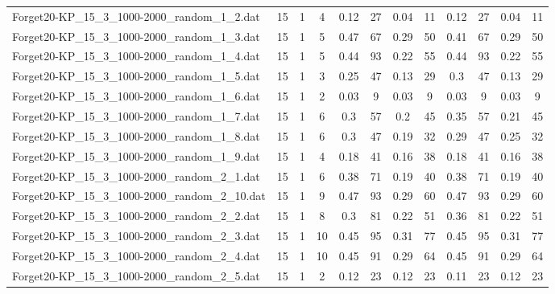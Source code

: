 \begin{sidewaystable}[!ht]
{\begin{tabular}{lccccccccccc}
Forget20-KP\_15\_3\_1000-2000\_random\_1\_2.dat & 15 & 1 & 4 & 0.12 & 27 &  \textcolor{blue2}{0.04} & 11 & 0.12 & 27 &  \textcolor{blue2}{0.04} & 11 \\
Forget20-KP\_15\_3\_1000-2000\_random\_1\_3.dat & 15 & 1 & 5 & 0.47 & 67 &  \textcolor{blue2}{0.29} & 50 & 0.41 & 67 &  \textcolor{blue2}{0.29} & 50 \\
Forget20-KP\_15\_3\_1000-2000\_random\_1\_4.dat & 15 & 1 & 5 & 0.44 & 93 &  \textcolor{blue2}{0.22} & 55 & 0.44 & 93 &  \textcolor{blue2}{0.22} & 55 \\
Forget20-KP\_15\_3\_1000-2000\_random\_1\_5.dat & 15 & 1 & 3 & 0.25 & 47 &  \textcolor{blue2}{0.13} & 29 & 0.3 & 47 &  \textcolor{blue2}{0.13} & 29 \\
Forget20-KP\_15\_3\_1000-2000\_random\_1\_6.dat & 15 & 1 & 2 &  \textcolor{blue2}{0.03} & 9 &  \textcolor{blue2}{0.03} & 9 &  \textcolor{blue2}{0.03} & 9 &  \textcolor{blue2}{0.03} & 9 \\
Forget20-KP\_15\_3\_1000-2000\_random\_1\_7.dat & 15 & 1 & 6 & 0.3 & 57 &  \textcolor{blue2}{0.2} & 45 & 0.35 & 57 & 0.21 & 45 \\
Forget20-KP\_15\_3\_1000-2000\_random\_1\_8.dat & 15 & 1 & 6 & 0.3 & 47 &  \textcolor{blue2}{0.19} & 32 & 0.29 & 47 & 0.25 & 32 \\
Forget20-KP\_15\_3\_1000-2000\_random\_1\_9.dat & 15 & 1 & 4 & 0.18 & 41 &  \textcolor{blue2}{0.16} & 38 & 0.18 & 41 &  \textcolor{blue2}{0.16} & 38 \\
Forget20-KP\_15\_3\_1000-2000\_random\_2\_1.dat & 15 & 1 & 6 & 0.38 & 71 &  \textcolor{blue2}{0.19} & 40 & 0.38 & 71 &  \textcolor{blue2}{0.19} & 40 \\
Forget20-KP\_15\_3\_1000-2000\_random\_2\_10.dat & 15 & 1 & 9 & 0.47 & 93 &  \textcolor{blue2}{0.29} & 60 & 0.47 & 93 &  \textcolor{blue2}{0.29} & 60 \\
Forget20-KP\_15\_3\_1000-2000\_random\_2\_2.dat & 15 & 1 & 8 & 0.3 & 81 &  \textcolor{blue2}{0.22} & 51 & 0.36 & 81 &  \textcolor{blue2}{0.22} & 51 \\
Forget20-KP\_15\_3\_1000-2000\_random\_2\_3.dat & 15 & 1 & 10 & 0.45 & 95 & 0.31 & 77 & 0.45 & 95 & 0.31 & 77 \\
Forget20-KP\_15\_3\_1000-2000\_random\_2\_4.dat & 15 & 1 & 10 & 0.45 & 91 &  \textcolor{blue2}{0.29} & 64 & 0.45 & 91 &  \textcolor{blue2}{0.29} & 64 \\
Forget20-KP\_15\_3\_1000-2000\_random\_2\_5.dat & 15 & 1 & 2 & 0.12 & 23 & 0.12 & 23 &  \textcolor{blue2}{0.11} & 23 & 0.12 & 23 \\

\end{tabular}}
\end{sidewaystable}
